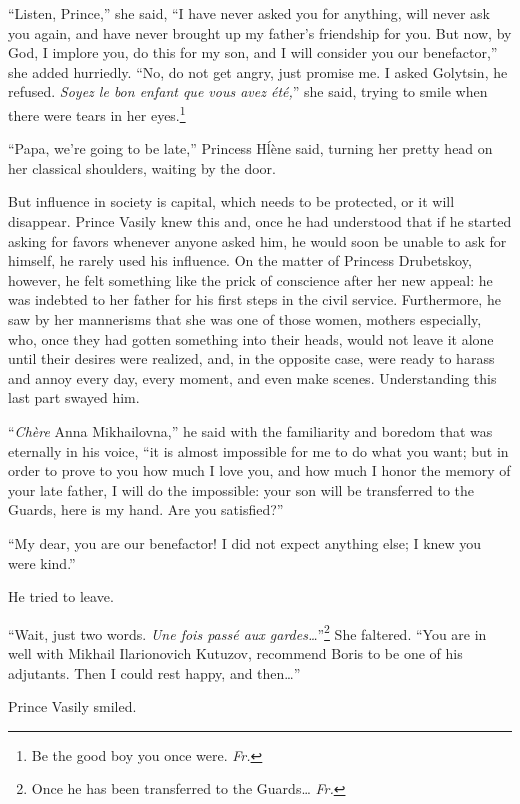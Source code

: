``Listen, Prince,'' she said, ``I have never asked you for anything, will never ask you again, and have never brought up my father's friendship for you. But now, by God, I implore you, do this for my son, and I will consider you our benefactor,'' she added hurriedly. ``No, do not get angry, just promise me. I asked Golytsin, he refused. \textit{Soyez le bon enfant que vous avez \'et\'e,}'' she said, trying to smile when there were tears in her eyes.\footnote{Be the good boy you once were. \textit{Fr.}} %

``Papa, we're going to be late,'' Princess H\'l\`ene said, turning her pretty head on her classical shoulders, waiting by the door. %

But influence in society is capital, which needs to be protected, or it will disappear. Prince Vasily knew this and, once he had understood that if he started asking for favors whenever anyone asked him, he would soon be unable to ask for himself, he rarely used his influence. On the matter of Princess Drubetskoy, however, he felt something like the prick of conscience after her new appeal: he was indebted to her father for his first steps in the civil service. Furthermore, he saw by her mannerisms that she was one of those women, mothers especially, who, once they had gotten something into their heads, would not leave it alone until their desires were realized, and, in the opposite case, were ready to harass and annoy every day, every moment, and even make scenes. Understanding this last part swayed him.

``\textit{Ch\`ere} Anna Mikhailovna,'' he said with the familiarity and boredom that was eternally in his voice, ``it is almost impossible for me to do what you want; but in order to prove to you how much I love you, and how much I honor the memory of your late father, I will do the impossible: your son will be transferred to the Guards, here is my hand. Are you satisfied?'' %

``My dear, you are our benefactor! I did not expect anything else; I knew you were kind.'' %

He tried to leave.

``Wait, just two words. \textit{Une fois pass\'e aux gardes\ldots{}}''\footnote{Once he has been transferred to the Guards\ldots{} \textit{Fr.}} She faltered. ``You are in well with Mikhail Ilarionovich Kutuzov, recommend Boris to be one of his adjutants. Then I could rest happy, and then\ldots{}'' %

Prince Vasily smiled.

